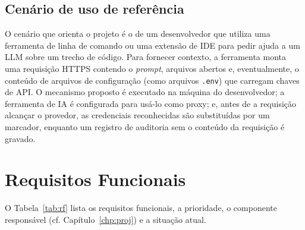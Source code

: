 \subsection{Cenário de uso de referência}

O cenário que orienta o projeto é o de um desenvolvedor que utiliza uma ferramenta de linha de comando ou uma extensão de IDE para pedir ajuda a um LLM sobre um trecho de código. Para fornecer contexto, a ferramenta monta uma requisição HTTPS contendo o \textit{prompt}, arquivos abertos e, eventualmente, o conteúdo de arquivos de configuração (como arquivos \texttt{.env}) que carregam chaves de API. O mecanismo proposto é executado na máquina do desenvolvedor; a ferramenta de IA é configurada para usá-lo como proxy; e, antes de a requisição alcançar o provedor, as credenciais reconhecidas são substituídas por um marcador, enquanto um registro de auditoria sem o conteúdo da requisição é gravado.

\section{Requisitos Funcionais}
\label{sec:req_rf}

O Tabela~\ref{tab:rf} lista os requisitos funcionais, a prioridade, o componente responsável (cf. Capítulo~\ref{chp:proj}) e a situação atual.

